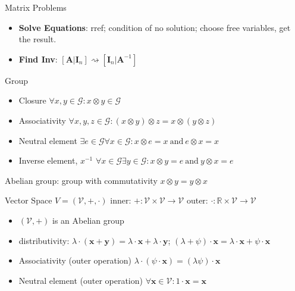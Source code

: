\documentclass[UTF8,a4paper]{article}
\begin{document}
\begin{multicols}{3}
\begin{cheatsheetblock}{Matrix Problems}
    \begin{itemize}
        \item \textbf{Solve Equations}: rref; condition of no solution; choose free variables, get the result.
        \item \textbf{Find Inv}: $ [\bm{A} | \bm{I}_{n}] \rightsquigarrow [\bm{I}_{n} | \bm{A}^{-1}]$
    \end{itemize}
\end{cheatsheetblock}

\begin{cheatsheetblock}{Group}
    \begin{itemize}
        \item Closure \hfill$\forall x,y\in\mathcal{G}:x\otimes y\in\mathcal{G}$
        \item Associativity \hfill $\forall x,y,z\in\mathcal{G}:(x\otimes y)\otimes z=x\otimes(y\otimes z)$
        \item Neutral element \hfill $\exists e\in\mathcal{G}\forall x\in\mathcal{G}:x\otimes e=x\mathrm{~and~}e\otimes x=x$
        \item Inverse element, $x^{-1}$ \hfill $\forall x\in\mathcal{G}\exists y\in\mathcal{G}:x\otimes y=e\mathrm{~and~}y\otimes x=e$
    \end{itemize}
    Abelian group: group with commutativity \hfill $x\otimes y=y\otimes x$
\end{cheatsheetblock}

\begin{cheatsheetblock}{Vector Space}
    $V=(\mathcal{V},+,\cdot)$ \hfill inner: $+:\mathcal{V}\times\mathcal{V}\to\mathcal{V}$ \hfill outer: $\cdot:\mathbb{R}\times\mathcal{V}\to\mathcal{V}$
    \begin{itemize}
        \item $(\mathcal{V},+)$ is an Abelian group
        \item distributivity: $\lambda\cdot(\boldsymbol{x}+\boldsymbol{y})=\lambda\cdot\boldsymbol{x}+\lambda\cdot\boldsymbol{y}$; $(\lambda+\psi)\cdot\boldsymbol{x}=\lambda\cdot\boldsymbol{x}+\psi\cdot\boldsymbol{x}$
        \item Associativity (outer operation) \hfill $\lambda\cdot(\psi\cdot\boldsymbol{x})=(\lambda\psi)\cdot\boldsymbol{x}$
        \item Neutral element (outer operation) \hfill $\forall\boldsymbol{x}\in\mathcal{V}:1\cdot\boldsymbol{x}=\boldsymbol{x}$
    \end{itemize}
\end{cheatsheetblock}


\end{multicols}
\end{document}
